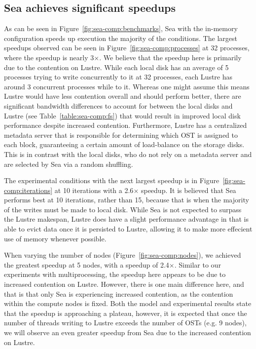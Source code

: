       \subsection{Sea achieves significant speedups}

      As can be seen in Figure~\ref{fig:sea-comp:benchmarks}, Sea with the
      in-memory configuration speeds up execution the majority of the
      conditions. The largest speedups observed can be seen in
      Figure~\ref{fig:sea-comp:processes} at 32 processes, where the speedup is
      nearly 3$\times$. We believe that the speedup here is primarily due to the
      contention on Lustre. While each local disk has an average of 5 processes
      trying to write concurrently to it at 32 processes, each Lustre has around
      3 concurrent processes while to it. Whereas one might assume this means
      Lustre would have less contention overall and should perform better, there
      are significant bandwidth differences to account for between the local
      disks and Lustre (see Table~\ref{table:sea-comp:fs}) that would result in
      improved local disk performance despite increased contention. Furthermore,
      Lustre has a centralized metadata server that is responsible for
      determining which OST is assigned to each block, guaranteeing a certain
      amount of load-balance on the storage disks. This is in contrast with the
      local disks, who do not rely on a metadata server and are selected by Sea
      via a random shuffling.

      The experimental conditions with the next largest speedup is in
      Figure~\ref{fig:sea-comp:iterations} at 10 iterations with a 2.6$\times$
      speedup. It is believed that Sea performs best at 10 iterations, rather
      than 15, because that is when the majority of the writes must be made to
      local disk. While Sea is not expected to surpass the Lustre makespan,
      Lustre does have a slight performance advantage in that is able to evict
      data once it is persisted to Lustre, allowing it to make more effecient
      use of memory whenever possible. 

      When varying the number of nodes (Figure~\ref{fig:sea-comp:nodes}), we
      achieved the greatest speedup at 5 nodes, with a speedup of 2.4$\times$.
      Similar to our experiments with multiprocessing, the speedup here appears
      to be due to increased contention on Lustre. However, there is one main
      difference here, and that is that only Sea is experiencing increased
      contention, as the contention within the compute nodes is fixed. Both the
      model and experimental results state that the speedup is approaching a
      plateau, however, it is expected that once the number of threads writing
      to Lustre exceeds the number of OSTs (e.g. 9 nodes), we will observe an
      even greater speedup from Sea due to the increased contention on Lustre.

